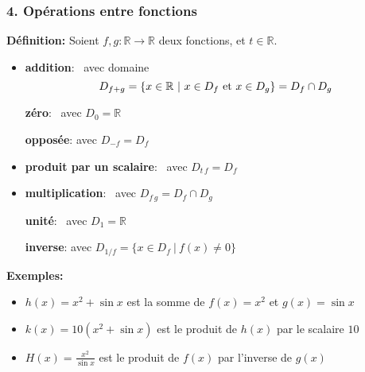 \documentclass[10pt]{beamer}
\newcommand{\bitem}{\item[$\bullet$]}
\newcommand{\R}{\mathbb R}
\begin{document}
\begin{frame}
\frametitle{\bf 4. Op\'erations entre fonctions}
\medskip 

{\bf D\'efinition:} 
Soient $f,g:\R\rightarrow\R$ deux fonctions, et $t\in\R$. 
\vspace*{1mm}

\begin{itemize}
\bitem
{\bf addition}:\  avec domaine 
\vspace*{-1mm}
$$
D_{f+g} =\{x\in\R\ |\ \mbox{$x\in D_f$ et $x\in D_g$} \} = D_f\cap D_g
\vspace*{-1mm}
$$

{\bf z\'ero}:\  avec $D_0=\R$
\vspace*{1mm}

{\bf oppos\'ee}:  avec $D_{-f}=D_f$
\vspace*{1mm}

\pause
\bitem
{\bf produit par un scalaire}:\  avec 
$D_{t\,f}=D_f$
\vspace*{1mm}

\pause
\bitem
{\bf multiplication}:\  avec 
$D_{f\,g}=D_f\cap D_g$
\vspace*{1mm}

{\bf unit\'e}:\  avec $D_1=\R$
\vspace*{0.5mm}

{\bf inverse}:  
avec $D_{1/f}=\{x\in D_f\ |\ f(x)\neq 0 \}$
\end{itemize}
\vspace*{0.5mm}

\pause
{\small 
{\bf Exemples:}
\begin{itemize}
\item
$h(x)=x^2+\sin x$ est la somme de $f(x)=x^2$ et $g(x)=\sin x$

\item
$k(x)=10(x^2+\sin x)$ est le produit de $h(x)$ par le scalaire $10$ 

\item
$H(x)=\frac{x^2}{\sin x}$ est le produit de $f(x)$ par l'inverse de $g(x)$
\end{itemize}
}

\end{frame}

\end{document}

